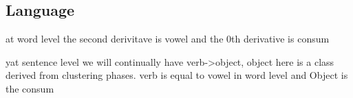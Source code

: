\documentclass[a4paper]{article}
\begin{document}
        \subsection{Language}
            at word level the second derivitave is vowel and the 0th derivative is consum
            
            yat sentence level we will continually have verb->object, object here is a class derived from clustering phases. verb is equal to vowel in word level and Object is the consum
            
            
\end{document}
